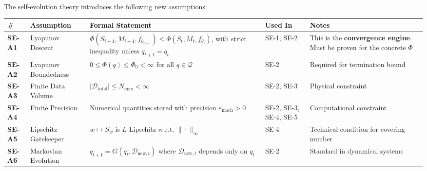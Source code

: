 \documentclass[
  12pt,
]{ctexart}
\begin{document}
The self-evolution theory introduces the following new assumptions:

\begin{longtable}[]{@{}
  >{\raggedright\arraybackslash}p{}
  >{\raggedright\arraybackslash}p{}
  >{\raggedright\arraybackslash}p{}
  >{\raggedright\arraybackslash}p{}
  >{\raggedright\arraybackslash}p{}@{}}
\toprule\noalign{}
\begin{minipage}[b]{\linewidth}\raggedright
\#
\end{minipage} & \begin{minipage}[b]{\linewidth}\raggedright
Assumption
\end{minipage} & \begin{minipage}[b]{\linewidth}\raggedright
Formal Statement
\end{minipage} & \begin{minipage}[b]{\linewidth}\raggedright
Used In
\end{minipage} & \begin{minipage}[b]{\linewidth}\raggedright
Notes
\end{minipage} \\
\midrule\noalign{}
\endhead
\bottomrule\noalign{}
\endlastfoot
\textbf{SE-A1} & Lyapunov Descent &
\(\Phi(S_{t+1}, M_{t+1}, f_{\theta_{t+1}}) \leq \Phi(S_t, M_t, f_{\theta_t})\),
with strict inequality unless \(q_{t+1} = q_t\) & SE-1, SE-2 & This is
the \textbf{convergence engine}. Must be proven for the concrete
\(\Phi\) \\
\textbf{SE-A2} & Lyapunov Boundedness &
\(0 \leq \Phi(q) \leq \Phi_0 < \infty\) for all \(q \in \mathcal{Q}\) &
SE-2 & Required for termination bound \\
\textbf{SE-A3} & Finite Data Volume &
\(|\mathcal{D}_{\text{total}}| \leq N_{\text{max}} < \infty\) & SE-2,
SE-3 & Physical constraint \\
\textbf{SE-A4} & Finite Precision & Numerical quantities stored with
precision \(\varepsilon_{\text{mach}} > 0\) & SE-2, SE-3, SE-4, SE-5 &
Computational constraint \\
\textbf{SE-A5} & Lipschitz Gatekeeper & \(w \mapsto S_w\) is
\(L\)-Lipschitz w.r.t. \(\|\cdot\|_\infty\) & SE-4 & Technical condition
for covering number \\
\textbf{SE-A6} & Markovian Evolution &
\(q_{t+1} = G(q_t, \mathcal{D}_{\text{new}, t})\) where
\(\mathcal{D}_{\text{new}, t}\) depends only on \(q_t\) & SE-2 &
Standard in dynamical systems \\
\end{longtable}
\end{document}
